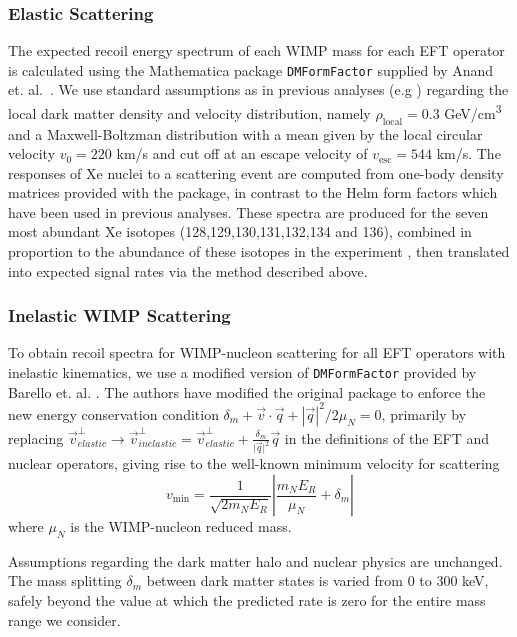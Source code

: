 %

\subsubsection{Elastic Scattering}
\label{subsubsec:Elastic}

The expected recoil energy spectrum of each WIMP mass for each EFT operator is calculated using the Mathematica package \texttt{DMFormFactor} supplied by Anand et. al.~\cite{Fitzpatrick:MathTools,Anand:MathTools}. We use standard assumptions as in previous analyses (e.g \cite{xe100_run_combination}) regarding the local dark matter density and velocity distribution, namely $\rho_\mathrm{local} = 0.3$ GeV/cm\textsuperscript{3} and a Maxwell-Boltzman distribution with a mean given by the local circular velocity $v_0 = 220$ km/s and cut off at an escape velocity of $v_\mathrm{esc} = 544$ km/s. The responses of Xe nuclei to a scattering event are computed from one-body density matrices provided with the package, in contrast to the Helm form factors which have been used in previous analyses. These spectra are produced for the seven most abundant Xe isotopes (128,129,130,131,132,134 and 136), combined in proportion to the abundance of these isotopes in the experiment \cite{xe100_run10_sd}, then translated into expected signal rates via the method described above.

\subsubsection{Inelastic WIMP Scattering}
\label{subsubsec:Inelastic}
To obtain recoil spectra for WIMP-nucleon scattering for all EFT operators with inelastic kinematics, we use a modified version of \texttt{DMFormFactor} provided by Barello et. al. \cite{InelasticMath}. The authors have modified the original package to enforce the new energy conservation condition $\delta_m + \vec{v}\cdot\vec{q} + \left|\vec{q}\right|^2/2\mu_N = 0$, primarily by replacing 
$\vec{v}^\perp_{elastic} \rightarrow \vec{v}^\perp_{inelastic} = \vec{v}^\perp_{elastic} +\frac{\delta_m}{\vert{\vec{q}}\vert^2}\vec{q}$ in the definitions of the EFT and nuclear operators, giving rise to the well-known minimum velocity for scattering
\begin{equation}
  v_\mathrm{min} = \frac{1}{\sqrt{2 m_N E_R}} \left|\frac{m_N E_R}{\mu_N} + \delta_m\right|
\end{equation}
where $\mu_N$ is the WIMP-nucleon reduced mass.

Assumptions regarding the dark matter halo and nuclear physics are unchanged. The mass splitting $\delta_m$ between dark matter states is varied from 0 to 300 keV, safely beyond the value at which the predicted rate is zero for the entire mass range we consider.
